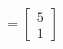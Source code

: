 \documentclass[preview]{standalone}
\begin{document}
\begin{align*}
= \begin{bmatrix} 5 \\ 1 \end{bmatrix}
\end{align*}
\end{document}
